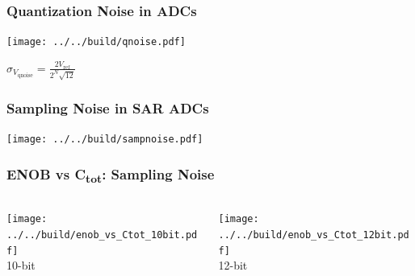 \documentclass[aspectratio=169]{beamer}
\begin{document}
\begin{frame}
  \frametitle{Quantization Noise in ADCs}
  \begin{center}
    \texttt{[image: ../../build/qnoise.pdf]}
    \vspace{1em}

    $\displaystyle \sigma_{V_{\mathrm{qnoise}}} = \frac{2 V_\mathrm{ref}}{2^N \sqrt{12}}$
  \end{center}
\end{frame}


\begin{frame}
  \frametitle{Sampling Noise in SAR ADCs}
  \begin{center}
    \texttt{[image: ../../build/sampnoise.pdf]}
  \end{center}
\end{frame}

\begin{frame}
  \frametitle{ENOB vs C\textsubscript{tot}: Sampling Noise}
  \begin{columns}
    \begin{column}{0.5\textwidth}
      \begin{center}
        \texttt{[image: ../../build/enob\_vs\_Ctot\_10bit.pdf]}
        \\
        \small 10-bit
      \end{center}
    \end{column}
    \begin{column}{0.5\textwidth}
      \begin{center}
        \texttt{[image: ../../build/enob\_vs\_Ctot\_12bit.pdf]}
        \\
        \small 12-bit
      \end{center}
    \end{column}
  \end{columns}
\end{frame}
\end{document}
